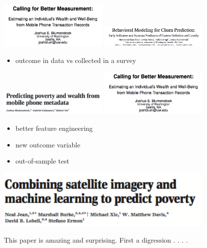 \documentclass[aspectratio=169]{beamer}
\def\vf{\vfill}
\begin{document}
\begin{frame}

\begin{center}
\includegraphics[width=0.4\textwidth]{figures/blumenstock_calling_2014_title}
\includegraphics[width=0.4\textwidth]{figures/khan_behavioral_2015_title}
\end{center}

\pause
\begin{itemize}
\item outcome in data vs collected in a survey
\end{itemize}

\end{frame}
\begin{frame}

\begin{center}
\includegraphics[width=0.4\textwidth]{figures/blumenstock_predicting_2015_title}
\includegraphics[width=0.4\textwidth]{figures/blumenstock_calling_2014_title}
\end{center}

\pause
\begin{itemize}
\item better feature engineering
\item new outcome variable
\item out-of-sample test
\end{itemize}

\end{frame}
\begin{frame}

\begin{center}
\includegraphics[width=0.8\textwidth]{figures/jean_combining_2016_title}
\end{center}

\vf

This paper is amazing and surprising.  First a digression . . . .

\end{frame}
\end{document}
